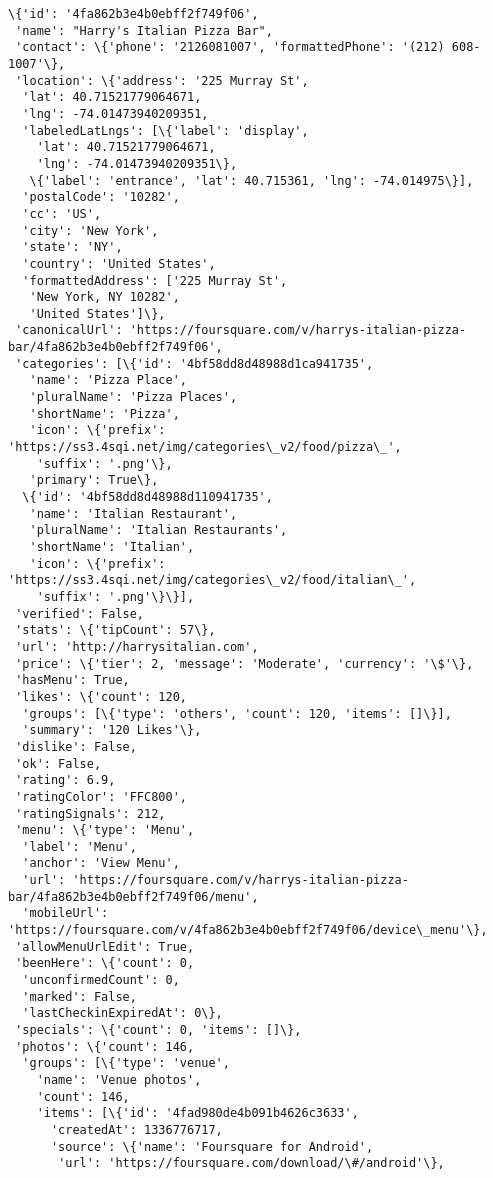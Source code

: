 \documentclass[11pt]{article}
\makeatletter
\newcommand{\boxspacing}{\kern\kvtcb@left@rule\kern\kvtcb@boxsep}
\newcommand{\prompt}[4]{
        \ttfamily\llap{{\color{#2}[#3]:\hspace{3pt}#4}}\vspace{-\baselineskip}
    }
\makeatother
\begin{document}
            \begin{tcolorbox}[breakable, size=fbox, boxrule=.5pt, pad at break*=1mm, opacityfill=0]
\prompt{Out}{outcolor}{17}{\boxspacing}
\begin{Verbatim}[commandchars=\\\{\}]
\{'id': '4fa862b3e4b0ebff2f749f06',
 'name': "Harry's Italian Pizza Bar",
 'contact': \{'phone': '2126081007', 'formattedPhone': '(212) 608-1007'\},
 'location': \{'address': '225 Murray St',
  'lat': 40.71521779064671,
  'lng': -74.01473940209351,
  'labeledLatLngs': [\{'label': 'display',
    'lat': 40.71521779064671,
    'lng': -74.01473940209351\},
   \{'label': 'entrance', 'lat': 40.715361, 'lng': -74.014975\}],
  'postalCode': '10282',
  'cc': 'US',
  'city': 'New York',
  'state': 'NY',
  'country': 'United States',
  'formattedAddress': ['225 Murray St',
   'New York, NY 10282',
   'United States']\},
 'canonicalUrl': 'https://foursquare.com/v/harrys-italian-pizza-
bar/4fa862b3e4b0ebff2f749f06',
 'categories': [\{'id': '4bf58dd8d48988d1ca941735',
   'name': 'Pizza Place',
   'pluralName': 'Pizza Places',
   'shortName': 'Pizza',
   'icon': \{'prefix': 'https://ss3.4sqi.net/img/categories\_v2/food/pizza\_',
    'suffix': '.png'\},
   'primary': True\},
  \{'id': '4bf58dd8d48988d110941735',
   'name': 'Italian Restaurant',
   'pluralName': 'Italian Restaurants',
   'shortName': 'Italian',
   'icon': \{'prefix': 'https://ss3.4sqi.net/img/categories\_v2/food/italian\_',
    'suffix': '.png'\}\}],
 'verified': False,
 'stats': \{'tipCount': 57\},
 'url': 'http://harrysitalian.com',
 'price': \{'tier': 2, 'message': 'Moderate', 'currency': '\$'\},
 'hasMenu': True,
 'likes': \{'count': 120,
  'groups': [\{'type': 'others', 'count': 120, 'items': []\}],
  'summary': '120 Likes'\},
 'dislike': False,
 'ok': False,
 'rating': 6.9,
 'ratingColor': 'FFC800',
 'ratingSignals': 212,
 'menu': \{'type': 'Menu',
  'label': 'Menu',
  'anchor': 'View Menu',
  'url': 'https://foursquare.com/v/harrys-italian-pizza-
bar/4fa862b3e4b0ebff2f749f06/menu',
  'mobileUrl': 'https://foursquare.com/v/4fa862b3e4b0ebff2f749f06/device\_menu'\},
 'allowMenuUrlEdit': True,
 'beenHere': \{'count': 0,
  'unconfirmedCount': 0,
  'marked': False,
  'lastCheckinExpiredAt': 0\},
 'specials': \{'count': 0, 'items': []\},
 'photos': \{'count': 146,
  'groups': [\{'type': 'venue',
    'name': 'Venue photos',
    'count': 146,
    'items': [\{'id': '4fad980de4b091b4626c3633',
      'createdAt': 1336776717,
      'source': \{'name': 'Foursquare for Android',
       'url': 'https://foursquare.com/download/\#/android'\},

\end{Verbatim}
\end{tcolorbox}
\end{document}
